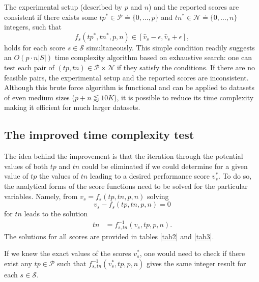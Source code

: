 \documentclass[3p, times]{elsarticle}
\begin{document}
The experimental setup (described by $p$ and $n$) and the reported scores are consistent if there exists some $tp^* \in \mathcal{P} \doteq \lbrace 0, \dots, p\rbrace$ and $tn^*\in\mathcal{N}\doteq \lbrace 0, \dots, n\rbrace$ integers, such that
\begin{equation}
\label{eqtest0}
f_s(tp^*, tn^*, p, n) \in [\hat{v}_s - \epsilon, \hat{v}_s + \epsilon],
\end{equation}
holds for each score $s\in\mathcal{S}$ simultaneously. This simple condition readily suggests an $O(p\cdot n\vert S\vert)$ time complexity algorithm based on exhaustive search: 
one can test each pair of $(tp, tn)\in \mathcal{P}\times\mathcal{N}$ if they satisfy the conditions. If there are no feasible pairs, the experimental setup and the reported scores are inconsistent. Although this brute force algorithm is functional and can be applied to datasets of even medium sizes ($p + n \lessapprox 10K$), it is possible to reduce its time complexity making it efficient for much larger datasets.

\subsection{The improved time complexity test}
\label{sec:improved}

The idea behind the improvement is that the iteration through the potential values of both $tp$ and $tn$ could be eliminated if we could determine for a given value of $tp$ the values of $tn$ leading to a desired performance score $v_s^{*}$. To do so, the analytical forms of the score functions need to be solved for the particular variables. Namely, from $v_s = f_s(tp, tn, p, n)$ solving
\begin{equation}
v_s - f_s(tp, tn, p, n) = 0
\end{equation}
for $tn$ leads to the solution
\begin{align}
\label{eq:solution}
tn &= f_{s, tn}^{-1}(v_s, tp, p, n).
\end{align}
The solutions for all scores are provided in tables \ref{tab2} and \ref{tab3}.

If we knew the exact values of the scores $v_s^*$, one would need to check if there exist any $tp\in\mathcal{P}$ such that \break $f_{s, tn}^{-1}(v_s^*, tp, p, n)$ gives the same integer result for each $s\in\mathcal{S}$.
\end{document}
